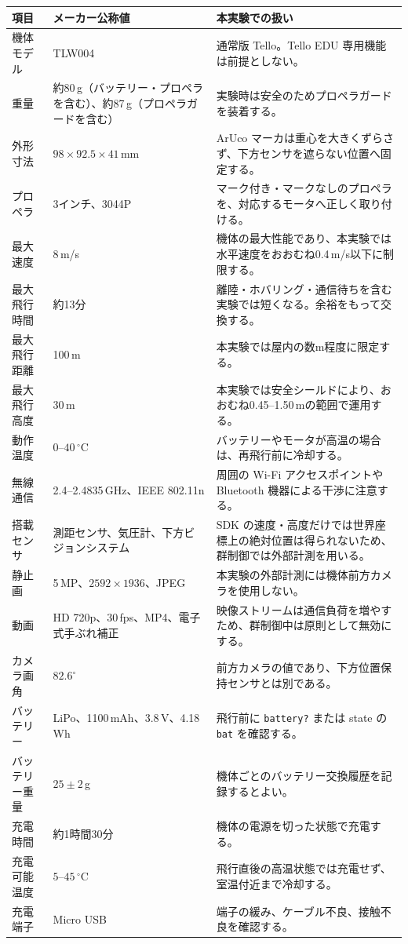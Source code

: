 \documentclass[11pt,a4paper]{ltjsarticle}
\newcommand{\code}[1]{\texttt{\small #1}}
\begin{document}
\begin{longtable}{@{}p{4.0cm}p{4.1cm}p{6.5cm}@{}}
\toprule
\textbf{項目} & \textbf{メーカー公称値} & \textbf{本実験での扱い} \\
\midrule
\endhead
機体モデル & TLW004 & 通常版 Tello。Tello EDU 専用機能は前提としない。\\
重量 & 約80\,g（バッテリー・プロペラを含む）、約87\,g（プロペラガードを含む） & 実験時は安全のためプロペラガードを装着する。\\
外形寸法 & $98 \times 92.5 \times 41$\,mm & ArUco マーカは重心を大きくずらさず、下方センサを遮らない位置へ固定する。\\
プロペラ & 3インチ、3044P & マーク付き・マークなしのプロペラを、対応するモータへ正しく取り付ける。\\
最大速度 & 8\,m/s & 機体の最大性能であり、本実験では水平速度をおおむね0.4\,m/s以下に制限する。\\
最大飛行時間 & 約13分 & 離陸・ホバリング・通信待ちを含む実験では短くなる。余裕をもって交換する。\\
最大飛行距離 & 100\,m & 本実験では屋内の数m程度に限定する。\\
最大飛行高度 & 30\,m & 本実験では安全シールドにより、おおむね0.45--1.50\,mの範囲で運用する。\\
動作温度 & $0$--$40\,{}^\circ$C & バッテリーやモータが高温の場合は、再飛行前に冷却する。\\
無線通信 & 2.4--2.4835\,GHz、IEEE 802.11n & 周囲の Wi-Fi アクセスポイントや Bluetooth 機器による干渉に注意する。\\
搭載センサ & 測距センサ、気圧計、下方ビジョンシステム & SDK の速度・高度だけでは世界座標上の絶対位置は得られないため、群制御では外部計測を用いる。\\
静止画 & 5\,MP、$2592 \times 1936$、JPEG & 本実験の外部計測には機体前方カメラを使用しない。\\
動画 & HD 720p、30\,fps、MP4、電子式手ぶれ補正 & 映像ストリームは通信負荷を増やすため、群制御中は原則として無効にする。\\
カメラ画角 & $82.6^\circ$ & 前方カメラの値であり、下方位置保持センサとは別である。\\
バッテリー & LiPo、1100\,mAh、3.8\,V、4.18\,Wh & 飛行前に \code{battery?} または state の \code{bat} を確認する。\\
バッテリー重量 & $25 \pm 2$\,g & 機体ごとのバッテリー交換履歴を記録するとよい。\\
充電時間 & 約1時間30分 & 機体の電源を切った状態で充電する。\\
充電可能温度 & $5$--$45\,{}^\circ$C & 飛行直後の高温状態では充電せず、室温付近まで冷却する。\\
充電端子 & Micro USB & 端子の緩み、ケーブル不良、接触不良を確認する。\\
\bottomrule
\end{longtable}
\end{document}
